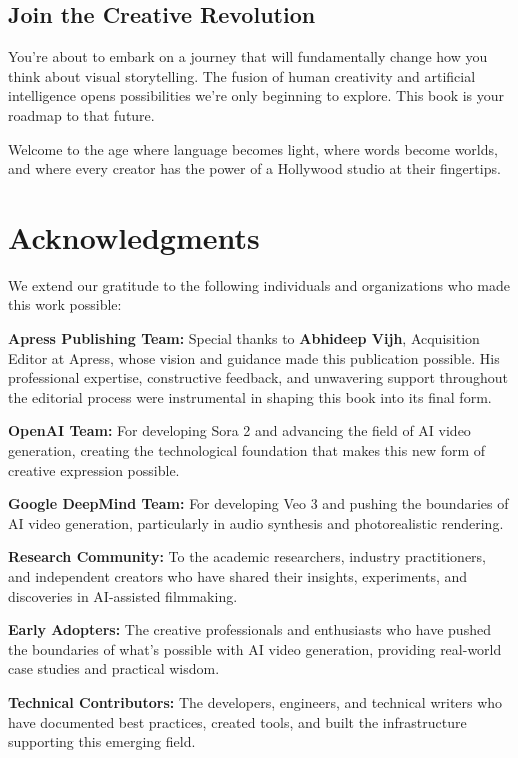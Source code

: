\documentclass[11pt,a4paper,openright]{book}
\begin{document}
\section*{Join the Creative Revolution}

You're about to embark on a journey that will fundamentally change how you think about visual storytelling. The fusion of human creativity and artificial intelligence opens possibilities we're only beginning to explore. This book is your roadmap to that future.

Welcome to the age where language becomes light, where words become worlds, and where every creator has the power of a Hollywood studio at their fingertips.

\chapter*{Acknowledgments}

We extend our gratitude to the following individuals and organizations who made this work possible:

\textbf{Apress Publishing Team:} Special thanks to \textbf{Abhideep Vijh}, Acquisition Editor at Apress, whose vision and guidance made this publication possible. His professional expertise, constructive feedback, and unwavering support throughout the editorial process were instrumental in shaping this book into its final form.

\textbf{OpenAI Team:} For developing Sora 2 and advancing the field of AI video generation, creating the technological foundation that makes this new form of creative expression possible.

\textbf{Google DeepMind Team:} For developing Veo 3 and pushing the boundaries of AI video generation, particularly in audio synthesis and photorealistic rendering.

\textbf{Research Community:} To the academic researchers, industry practitioners, and independent creators who have shared their insights, experiments, and discoveries in AI-assisted filmmaking.

\textbf{Early Adopters:} The creative professionals and enthusiasts who have pushed the boundaries of what's possible with AI video generation, providing real-world case studies and practical wisdom.

\textbf{Technical Contributors:} The developers, engineers, and technical writers who have documented best practices, created tools, and built the infrastructure supporting this emerging field.
\end{document}
